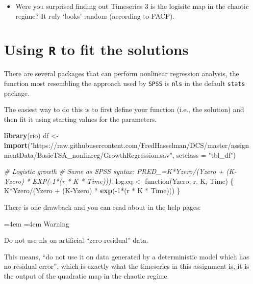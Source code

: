\documentclass[]{book}
\newenvironment{Shaded}{\begin{snugshade}}{\end{snugshade}}
\newcommand{\KeywordTok}[1]{\textcolor[rgb]{0.13,0.29,0.53}{\textbf{{#1}}}}
\newcommand{\DataTypeTok}[1]{\textcolor[rgb]{0.13,0.29,0.53}{{#1}}}
\newcommand{\DecValTok}[1]{\textcolor[rgb]{0.00,0.00,0.81}{{#1}}}
\newcommand{\StringTok}[1]{\textcolor[rgb]{0.31,0.60,0.02}{{#1}}}
\newcommand{\CommentTok}[1]{\textcolor[rgb]{0.56,0.35,0.01}{\textit{{#1}}}}
\newcommand{\NormalTok}[1]{{#1}}
\providecommand{\tightlist}{%
  \setlength{\itemsep}{0pt}\setlength{\parskip}{0pt}}
\renewenvironment{quote}{%
  \par \small \medskip \block
  \leftskip=4em \rightskip=4em%
  \noindent \ignorespaces}{%
  \par \medskip
  }
\let\stdsection\section
\renewcommand\section{\newpage\stdsection}
\begin{document}
\begin{itemize}
\tightlist
\item
  Were you surprised finding out Timeseries 3 is the logisitc map in the
  chaotic regime? It ruly `looks' random (according to PACF).
\end{itemize}

\section{\texorpdfstring{Using \texttt{R} to fit the
solutions}{Using R to fit the solutions}}\label{using-r-to-fit-the-solutions}

There are several packages that can perform nonlinear regression
analysis, the function most resembling the approach used by
\texttt{SPSS} is \texttt{nls} in the default \texttt{stats} package.

The easiest way to do this is to first define your function (i.e., the
solution) and then fit it using starting values for the parameters.

\begin{Shaded}
\begin{Highlighting}[]
\KeywordTok{library}\NormalTok{(rio)}
\NormalTok{df <-}\StringTok{ }\KeywordTok{import}\NormalTok{(}\StringTok{"https://raw.githubusercontent.com/FredHasselman/DCS/master/assignmentData/BasicTSA_nonlinreg/GrowthRegression.sav"}\NormalTok{, }\DataTypeTok{setclass =} \StringTok{"tbl_df"}\NormalTok{)}

\CommentTok{# Logistic growth}
\CommentTok{# Same as SPSS syntax: PRED_=K*Yzero/(Yzero + (K-Yzero) * EXP(-1*(r * K * Time))).}
\NormalTok{log.eq <-}\StringTok{ }\NormalTok{function(Yzero, r, K, Time) \{}
    \NormalTok{K*Yzero/(Yzero +}\StringTok{ }\NormalTok{(K-Yzero) *}\StringTok{ }\KeywordTok{exp}\NormalTok{(-}\DecValTok{1}\NormalTok{*(r *}\StringTok{ }\NormalTok{K *}\StringTok{ }\NormalTok{Time)))}
\NormalTok{\}}
\end{Highlighting}
\end{Shaded}

There is one drawback and you can read about in the help pages:

\begin{quote}
Warning

Do not use nls on artificial ``zero-residual'' data.
\end{quote}

This means, ``do not use it on data generated by a deterministic model
which has no residual error'', which is exactly what the timeseries in
this assignment is, it is the output of the quadratic map in the chaotic
regime.
\end{document}
